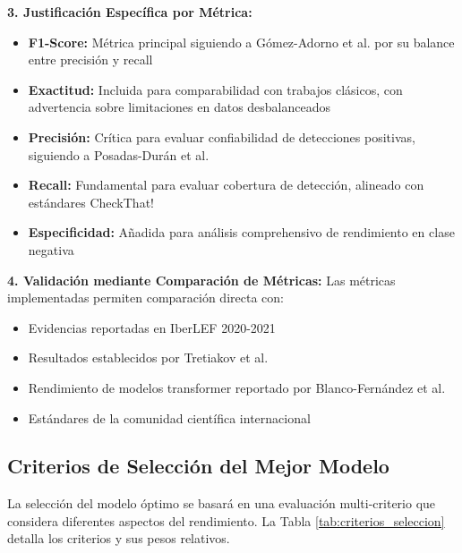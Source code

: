 \textbf{3. Justificación Específica por Métrica:}
\begin{itemize}
    \item \textbf{F1-Score:} Métrica principal siguiendo a Gómez-Adorno et al. \cite{gomez2021overview} por su balance entre precisión y recall
    \item \textbf{Exactitud:} Incluida para comparabilidad con trabajos clásicos, con advertencia sobre limitaciones en datos desbalanceados
    \item \textbf{Precisión:} Crítica para evaluar confiabilidad de detecciones positivas, siguiendo a Posadas-Durán et al. \cite{posadas2019detection}
    \item \textbf{Recall:} Fundamental para evaluar cobertura de detección, alineado con estándares CheckThat! \cite{barron2023clef}
    \item \textbf{Especificidad:} Añadida para análisis comprehensivo de rendimiento en clase negativa
\end{itemize}

\textbf{4. Validación mediante Comparación de Métricas:}
Las métricas implementadas permiten comparación directa con:
\begin{itemize}
    \item Evidencias reportadas en IberLEF 2020-2021
    \item Resultados establecidos por Tretiakov et al. \cite{tretiakov2022detection}
    \item Rendimiento de modelos transformer reportado por Blanco-Fernández et al. \cite{blanco2024enhancing}
    \item Estándares de la comunidad científica internacional
\end{itemize}

\subsection{Criterios de Selección del Mejor Modelo}

La selección del modelo óptimo se basará en una evaluación multi-criterio que considera diferentes aspectos del rendimiento. La Tabla \ref{tab:criterios_seleccion} detalla los criterios y sus pesos relativos.

